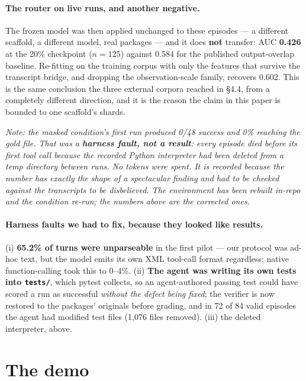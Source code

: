 \documentclass[10pt]{article}
\newcommand{\code}[1]{\texttt{\small #1}}
\begin{document}
\paragraph{The router on live runs, and another negative.}
The frozen model was then applied unchanged to these episodes --- a different scaffold, a different
model, real packages --- and it does \textbf{not} transfer: AUC \textbf{0.426} at the 20\%
checkpoint ($n=125$) against 0.584 for the published output-overlap baseline. Re-fitting on the
training corpus with only the features that survive the transcript bridge, and dropping the
observation-scale family, recovers 0.602. This is the same conclusion the three external corpora
reached in \S4.4, from a completely different direction, and it is the reason the claim in this
paper is bounded to one scaffold's shards.

\noindent\emph{Note: the masked condition's first run produced 0/48 success and 0\% reaching the
gold file. That was a \textbf{harness fault, not a result}: every episode died before its first tool
call because the recorded Python interpreter had been deleted from a temp directory between runs.
No tokens were spent. It is recorded because the number has exactly the shape of a spectacular
finding and had to be checked against the transcripts to be disbelieved. The environment has been
rebuilt in-repo and the condition re-run; the numbers above are the corrected ones.}

\paragraph{Harness faults we had to fix, because they looked like results.}
(i) \textbf{65.2\% of turns were unparseable} in the first pilot --- our protocol was ad-hoc text,
but the model emits its own XML tool-call format regardless; native function-calling took this to
0--4\%. (ii) \textbf{The agent was writing its own tests into \code{tests/}}, which pytest collects,
so an agent-authored passing test could have scored a run as successful \emph{without the defect
being fixed}; the verifier is now restored to the packages' originals before grading, and in 72 of
84 valid episodes the agent had modified test files (1{,}076 files removed). (iii) the deleted
interpreter, above.

\section{The demo}
\end{document}
